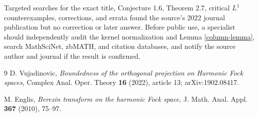 \documentclass[11pt]{article}
\begin{document}
Targeted searches for the exact title, Conjecture 1.6, Theorem 2.7,
critical $L^1$ counterexamples, corrections, and errata found the source's
2022 journal publication but no correction or later answer.  Before public
use, a specialist should independently audit the kernel normalization and
Lemma \ref{column-lemma}, search MathSciNet, zbMATH, and citation databases,
and notify the source author and journal if the result is confirmed.

\begin{thebibliography}{9}
D. Vujadinovic,
\emph{Boundedness of the orthogonal projection on Harmonic Fock spaces},
Complex Anal. Oper. Theory \textbf{16} (2022), article 13;
arXiv:1902.08417.

M. Englis,
\emph{Berezin transform on the harmonic Fock space},
J. Math. Anal. Appl. \textbf{367} (2010), 75--97.
\end{thebibliography}
\end{document}
